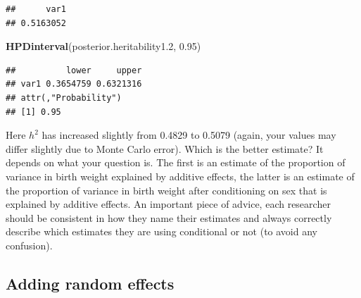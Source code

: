 \documentclass[
  12pt,
]{book}
\newenvironment{Shaded}{\begin{snugshade}}{\end{snugshade}}
\newcommand{\FloatTok}[1]{\textcolor[rgb]{0.00,0.00,0.81}{#1}}
\newcommand{\KeywordTok}[1]{\textcolor[rgb]{0.13,0.29,0.53}{\textbf{#1}}}
\newcommand{\NormalTok}[1]{#1}
\newcommand{\OperatorTok}[1]{\textcolor[rgb]{0.81,0.36,0.00}{\textbf{#1}}}
\newcommand{\StringTok}[1]{\textcolor[rgb]{0.31,0.60,0.02}{#1}}
\begin{document}
\begin{Shaded}
\end{Shaded}

\begin{verbatim}
##      var1 
## 0.5163052
\end{verbatim}

\begin{Shaded}
\begin{Highlighting}[]
\KeywordTok{HPDinterval}\NormalTok{(posterior.heritability1}\FloatTok{.2}\NormalTok{, }\FloatTok{0.95}\NormalTok{)}
\end{Highlighting}
\end{Shaded}

\begin{verbatim}
##          lower     upper
## var1 0.3654759 0.6321316
## attr(,"Probability")
## [1] 0.95
\end{verbatim}

Here \(h^2\) has increased slightly from 0.4829 to 0.5079 (again, your values may differ slightly due to Monte Carlo error). Which is the better estimate?
It depends on what your question is. The first is an estimate of the proportion of variance in birth weight explained by additive effects, the latter is an estimate of the proportion of variance in birth weight after conditioning on sex that is explained by additive effects.
An important piece of advice, each researcher should be consistent in how they name their estimates and always correctly describe which estimates they are using conditional or not (to avoid any confusion).

\hypertarget{adding-random-effects-1}{%
\subsection{Adding random effects}\label{adding-random-effects-1}}
\end{document}
